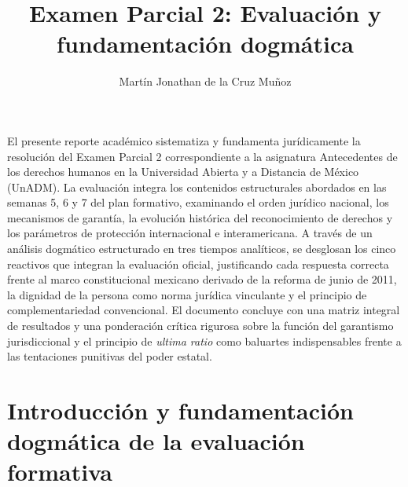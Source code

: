 \documentclass[12pt,spanish,letterpaper,oneside]{article}
\author{Mart\'in Jonathan de la Cruz Mu\~noz}
\title{Examen Parcial 2: Evaluaci\'on y fundamentaci\'on dogm\'atica}
\begin{document}
\templatePortrait
\templatePagecfg
\templateFinalcfg

\begin{abstractd}
El presente reporte acad\'emico sistematiza y fundamenta jur\'idicamente la resoluci\'on del Examen Parcial 2 correspondiente a la asignatura Antecedentes de los derechos humanos en la Universidad Abierta y a Distancia de M\'exico (UnADM). La evaluaci\'on integra los contenidos estructurales abordados en las semanas 5, 6 y 7 del plan formativo, examinando el orden jur\'idico nacional, los mecanismos de garant\'ia, la evoluci\'on hist\'orica del reconocimiento de derechos y los par\'ametros de protecci\'on internacional e interamericana. A trav\'es de un an\'alisis dogm\'atico estructurado en tres tiempos anal\'iticos, se desglosan los cinco reactivos que integran la evaluaci\'on oficial, justificando cada respuesta correcta frente al marco constitucional mexicano derivado de la reforma de junio de 2011, la dignidad de la persona como norma jur\'idica vinculante y el principio de complementariedad convencional. El documento concluye con una matriz integral de resultados y una ponderaci\'on cr\'itica rigurosa sobre la funci\'on del garantismo jurisdiccional y el principio de \emph{ultima ratio} como baluartes indispensables frente a las tentaciones punitivas del poder estatal.
\end{abstractd}

\templateIndex

\clearpage
\section[Introducci\'on y fundamentaci\'on]{Introducci\'on y fundamentaci\'on dogm\'atica de la evaluaci\'on formativa}
\end{document}
